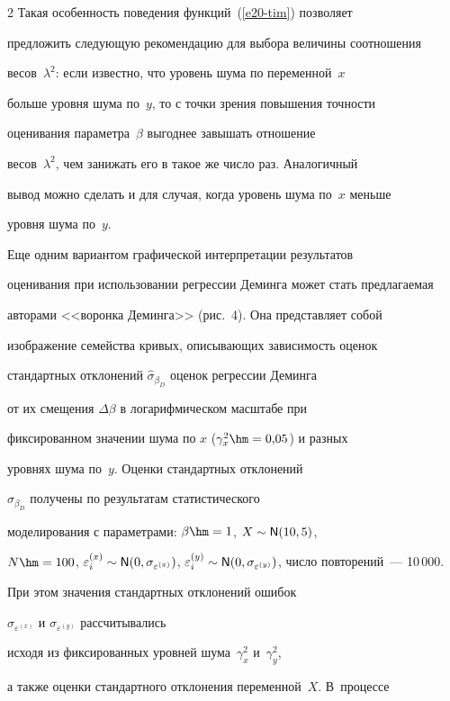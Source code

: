 \begin{multicols}{2}
  Такая особенность поведения функций~(\ref{e20-tim}) позволяет

предложить следующую рекомендацию для выбора величины соотношения

весов~$\lambda^2$: если известно, что уровень шума по переменной~$x$

больше уровня шума по~$y$, то с точки зрения повышения точности

оценивания параметра~$\beta$ выгоднее завышать отношение

весов~$\lambda^2$, чем занижать его в такое же число раз. Аналогичный

вывод можно сделать и для случая, когда уровень шума по~$x$ меньше

уровня шума по~$y$.



  Еще одним вариантом графической интерпретации результатов

оценивания при использовании регрессии Деминга может стать предлагаемая

авторами <<воронка Деминга>> (рис.~4). Она представляет собой

изображение семейства кривых, опи\-сы\-ва\-ющих зависимость оценок

стандартных отклонений $\hat{\sigma}_{\beta_D}$ оценок регрессии Деминга

от их смещения $\Delta\beta$ в логарифмическом масштабе при

фиксированном значении шума по $x$ ($\gamma_x^2\hm=0{,}05$) и разных

уровнях шума по~$y$. Оценки стандартных отклонений

$\hat{\sigma}_{\beta_D}$ получены по результатам статистического

моделирования с параметрами: $\beta\hm=1$, $X\sim {\sf N}(10,5)$,

${N}\hm=100$, $\varepsilon_i^{(x)}\sim {\sf N}(0,

\sigma_{\varepsilon^{(x)}})$, $\varepsilon_i^{(y)} \sim

{\sf N}(0,\sigma_{\varepsilon^{(y)}})$, число повторений~--- 10\,000.

При этом значения стандартных отклонений ошибок

$\sigma_{\varepsilon^{(x)}}$ и $\sigma_{\varepsilon^{(y)}}$ рассчитывались

исходя из фиксированных уровней шума~$\gamma_x^2$ и~$\gamma_y^2$,

а также оценки стандартного отклонения переменной~$X$. В~процессе


\end{multicols}
